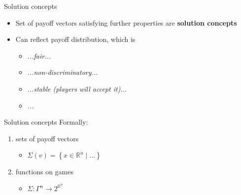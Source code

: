 \documentclass{beamer}
\newcommand{\Rn}[1][n]{\mathbb{R}^{#1}}
\begin{document}

\begin{frame}{Solution concepts}
	\begin{itemize}
	    \item Set of payoff vectors satisfying further properties are \textbf{solution concepts}
	    \item Can reflect payoff distribution, which is
	    \begin{itemize}
	        \item \textit{...fair...}
	        \item \textit{...non-discriminatory...}
	        \item \textit{...stable (players will accept it)...} 
	        \item \textit{...}
	    \end{itemize}
	\end{itemize}
\end{frame}



\begin{frame}{Solution concepts}
    Formally:
	\begin{enumerate}
	    \item sets of payoff vectors 
	    \begin{itemize}
	        \item $\Sigma(v) = \left\{x \in \Rn \mid \dots\right\}$
	    \end{itemize}
	    \item functions on games
	    \begin{itemize}
	        \item $\Sigma \colon \Gamma^n \to 2^{\Rn}$
	    \end{itemize}
	\end{enumerate}
\end{frame}


\end{document}
